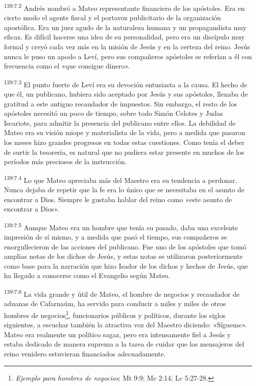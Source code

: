 \par 
\textsuperscript{139:7.2} Andrés nombró a Mateo representante financiero de los apóstoles. Era en cierto modo el agente fiscal y el portavoz publicitario de la organización apostólica. Era un juez agudo de la naturaleza humana y un propagandista muy eficaz. Es difícil hacerse una idea de su personalidad, pero era un discípulo muy formal y creyó cada vez más en la misión de Jesús y en la certeza del reino. Jesús nunca le puso un apodo a Leví, pero sus compañeros apóstoles se referían a él con frecuencia como el «que consigue dinero».

\par 
\textsuperscript{139:7.3} El punto fuerte de Leví era su devoción entusiasta a la causa. El hecho de que él, un publicano, hubiera sido aceptado por Jesús y sus apóstoles, llenaba de gratitud a este antiguo recaudador de impuestos. Sin embargo, el resto de los apóstoles necesitó un poco de tiempo, sobre todo Simón Celotes y Judas Iscariote, para admitir la presencia del publicano entre ellos. La debilidad de Mateo era su visión miope y materialista de la vida, pero a medida que pasaron los meses hizo grandes progresos en todas estas cuestiones. Como tenía el deber de surtir la tesorería, es natural que no pudiera estar presente en muchos de los períodos más preciosos de la instrucción.

\par 
\textsuperscript{139:7.4} Lo que Mateo apreciaba más del Maestro era su tendencia a perdonar. Nunca dejaba de repetir que la fe era lo único que se necesitaba en el asunto de encontrar a Dios. Siempre le gustaba hablar del reino como «este asunto de encontrar a Dios».

\par 
\textsuperscript{139:7.5} Aunque Mateo era un hombre que tenía su pasado, daba una excelente impresión de sí mismo, y a medida que pasó el tiempo, sus compañeros se enorgullecieron de las acciones del publicano. Fue uno de los apóstoles que tomó amplias notas de los dichos de Jesús, y estas notas se utilizaron posteriormente como base para la narración que hizo Isador de los dichos y hechos de Jesús, que ha llegado a conocerse como el Evangelio según Mateo.

\par 
\textsuperscript{139:7.6} La vida grande y útil de Mateo, el hombre de negocios y recaudador de aduanas de Cafarnaúm, ha servido para conducir a miles y miles de otros hombres de negocios\footnote{\textit{Ejemplo para hombres de negocios}: Mt 9:9; Mc 2:14; Lc 5:27-28.}, funcionarios públicos y políticos, durante los siglos siguientes, a escuchar también la atractiva voz del Maestro diciendo: «Sígueme». Mateo era realmente un político sagaz, pero era intensamente fiel a Jesús y estaba dedicado de manera suprema a la tarea de cuidar que los mensajeros del reino venidero estuvieran financiados adecuadamente.

